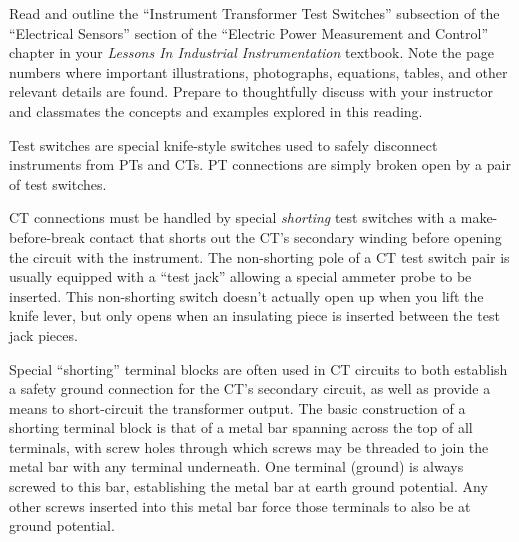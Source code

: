 

Read and outline the ``Instrument Transformer Test Switches'' subsection of the ``Electrical Sensors'' section of the ``Electric Power Measurement and Control'' chapter in your {\it Lessons In Industrial Instrumentation} textbook.  Note the page numbers where important illustrations, photographs, equations, tables, and other relevant details are found.  Prepare to thoughtfully discuss with your instructor and classmates the concepts and examples explored in this reading.













Test switches are special knife-style switches used to safely disconnect instruments from PTs and CTs.  PT connections are simply broken open by a pair of test switches.  

\vskip 10pt

CT connections must be handled by special {\it shorting} test switches with a make-before-break contact that shorts out the CT's secondary winding before opening the circuit with the instrument.  The non-shorting pole of a CT test switch pair is usually equipped with a ``test jack'' allowing a special ammeter probe to be inserted.  This non-shorting switch doesn't actually open up when you lift the knife lever, but only opens when an insulating piece is inserted between the test jack pieces.

\vskip 10pt

Special ``shorting'' terminal blocks are often used in CT circuits to both establish a safety ground connection for the CT's secondary circuit, as well as provide a means to short-circuit the transformer output.  The basic construction of a shorting terminal block is that of a metal bar spanning across the top of all terminals, with screw holes through which screws may be threaded to join the metal bar with any terminal underneath.  One terminal (ground) is always screwed to this bar, establishing the metal bar at earth ground potential.  Any other screws inserted into this metal bar force those terminals to also be at ground potential.

